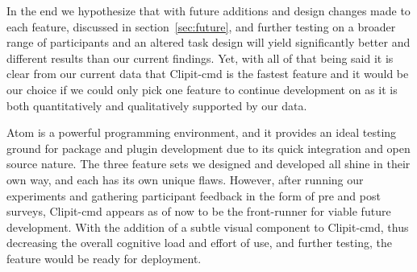 \documentclass{acm_proc_article-sp}
\begin{document}
In the end we hypothesize that with future additions and design changes made to each feature, discussed in section~\ref{sec:future}, and further testing on a broader range of participants and an altered task design will yield significantly better and different results than our current findings. Yet, with all of that being said it is clear from our current data that Clipit-cmd is the fastest feature and it would be our choice if we could only pick one feature to continue development on as it is both quantitatively and qualitatively supported by our data.

Atom is a powerful programming environment, and it provides an ideal testing ground for package and plugin development due to its quick integration and open source nature. The three feature sets we designed and developed all shine in their own way, and each has its own unique flaws. However, after running our experiments and gathering participant feedback in the form of pre and post surveys, Clipit-cmd appears as of now to be the front-runner for viable future development. With the addition of a subtle visual component to Clipit-cmd, thus decreasing the overall cognitive load and effort of use, and further testing, the feature would be ready for deployment.





\end{document}
